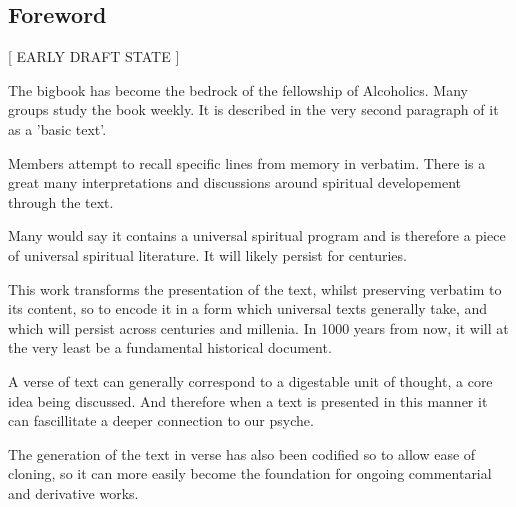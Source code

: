 \begin{fmatterchapter}

\chapter*{Foreword}

\begin{center}[ EARLY DRAFT STATE ]\end{center}

The bigbook has become the bedrock of the fellowship of Alcoholics. Many groups study the book weekly. It is described in the very second paragraph of it as a 'basic text'.

Members attempt to recall specific lines from memory in verbatim. There is a great many interpretations and discussions around spiritual developement through the text.

Many would say it contains a universal spiritual program and is therefore a piece of universal spiritual literature. It will likely persist for centuries.

This work transforms the presentation of the text, whilst preserving verbatim to its content, so to encode it in a form which universal texts generally take, and which will persist across centuries and millenia. In 1000 years from now, it will at the very least be a fundamental historical document.

A verse of text can generally correspond to a digestable unit of thought, a core idea being discussed. And therefore when a text is presented in this manner it can fascillitate a deeper connection to our psyche.

The generation of the text in verse has also been codified so to allow ease of cloning, so it can more easily become the foundation for ongoing commentarial and derivative works.

\end{fmatterchapter}
